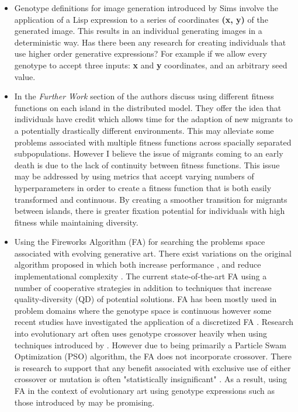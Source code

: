 \documentclass[10pt,a4paper]{article}
\begin{document}
\begin{itemize}
	\item Genotype definitions for image generation introduced by Sims \cite{sims} involve the application of a Lisp expression to a series of coordinates \textbf{(x, y)} of the generated image.
	This results in an individual generating images in a deterministic way.
	Has there been any research for creating individuals that use higher order generative expressions?
	For example if we allow every genotype to accept three inputs: \textbf{x} and \textbf{y} coordinates, and an arbitrary seed value.
	
	\item In the \textit{Further Work} section of \cite{distributed-evolutionary-art} the authors discuss using different fitness functions on each island in the distributed model.
	They offer the idea that individuals have credit which allows time for the adaption of new migrants to a potentially drastically different environments.
	This may alleviate some problems associated with multiple fitness functions across spacially separated subpopulations.
	However I believe the issue of migrants coming to an early death is due to the lack of continuity between fitness functions.
	This issue may be addressed by using metrics that accept varying numbers of hyperparameters in order to create a fitness function that is both easily transformed and continuous.
	By creating a smoother transition for migrants between islands, there is greater fixation potential for individuals with high fitness while maintaining diversity.
	
	\item Using the Fireworks Algorithm (FA) \cite{fireworks} for searching the problems space associated with evolving generative art.
	There exist variations on the original algorithm proposed in \cite{fireworks} which both increase performance \cite{fireworks-adaptive, fireworks-enhanced, fireworks-cooperative}, and reduce implementational complexity \cite{fireworks-bare-bones}.
	The current state-of-the-art FA using a number of cooperative strategies \cite{fireworks-cooperative} in addition to techniques that increase quality-diversity (QD) of potential solutions.
	FA has been mostly used in problem domains where the genotype space is continuous however some recent studies have investigated the application of a discretized FA \cite{fireworks-discrete-combinatorial, fireworks-discrete-tsp}.
	Research into evolutionary art often uses genotype crossover heavily when using techniques introduced by \cite{sims}.
	However due to being primarily a Particle Swam Optimization (PSO) algorithm, the FA does not incorporate crossover.
	There is research to support that any benefit associated with exclusive use of either crossover or mutation is often "statistically insignificant" \cite{mutation-vs-crossover,mutation-vs-crossover-revised}.
	As a result, using FA in the context of evolutionary art using genotype expressions such as those introduced by \cite{sims} may be promising.
	

\end{itemize}
\end{document}
